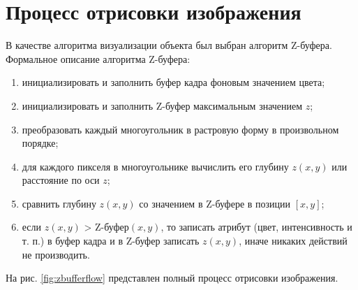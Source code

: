 \section{Процесс отрисовки изображения}
\hspace{0.6cm}В качестве алгоритма визуализации объекта был выбран алгоритм Z-буфера. Формальное описание алгоритма Z-буфера:
\begin{enumerate}
	\item инициализировать и заполнить буфер кадра фоновым значением цвета;
	\item инициализировать и заполнить Z-буфер максимальным значением $z$;
	\item преобразовать каждый многоугольник в растровую форму в произвольном порядке; 
	\item для каждого пикселя в многоугольнике вычислить его глубину $z(x, y)$ или расстояние по оси $z$;
	\item сравнить глубину $z(x, y)$ со значением в Z-буфере в позиции $[x, y]$;
	\item если $z(x, y)$ > Z-буфер$(x, y)$, то записать атрибут (цвет, интенсивность и т. п.) в буфер кадра и в Z-буфер записать $z(x, y)$, иначе никаких действий не производить.
\end{enumerate}

На рис. \ref{fig:zbufferflow} представлен полный процесс отрисовки изображения.

